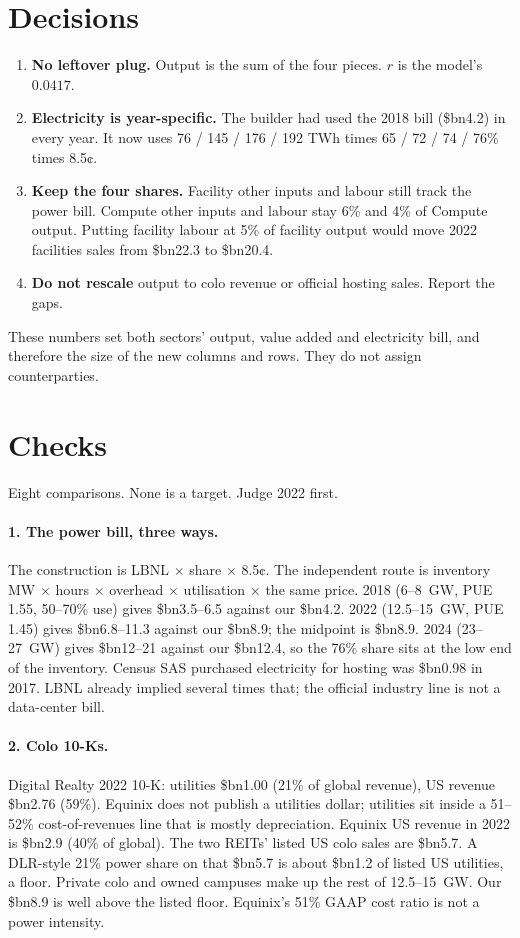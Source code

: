 \documentclass[11pt]{article}
\newcommand{\bn}{\$bn}
\begin{document}
\section{Decisions}

\begin{enumerate}
\item \textbf{No leftover plug.} Output is the sum of the four pieces. $r$ is the model's $0.0417$.
\item \textbf{Electricity is year-specific.} The builder had used the 2018 bill (\bn4.2) in every year. It now uses 76 / 145 / 176 / 192 TWh times 65 / 72 / 74 / 76\% times 8.5¢.
\item \textbf{Keep the four shares.} Facility other inputs and labour still track the power bill. Compute other inputs and labour stay 6\% and 4\% of Compute output. Putting facility labour at 5\% of facility output would move 2022 facilities sales from \bn22.3 to \bn20.4.
\item \textbf{Do not rescale} output to colo revenue or official hosting sales. Report the gaps.
\end{enumerate}

These numbers set both sectors' output, value added and electricity bill, and therefore the size of the new columns and rows. They do not assign counterparties.

\section{Checks}
\label{sec:checks}

Eight comparisons. None is a target. Judge 2022 first.

\paragraph{1. The power bill, three ways.}
The construction is LBNL $\times$ share $\times$ 8.5¢. The independent route is inventory MW $\times$ hours $\times$ overhead $\times$ utilisation $\times$ the same price. 2018 (6--8~GW, PUE 1.55, 50--70\% use) gives \bn3.5--6.5 against our \bn4.2. 2022 (12.5--15~GW, PUE 1.45) gives \bn6.8--11.3 against our \bn8.9; the midpoint is \bn8.9. 2024 (23--27~GW) gives \bn12--21 against our \bn12.4, so the 76\% share sits at the low end of the inventory. Census SAS purchased electricity for hosting was \bn0.98 in 2017. LBNL already implied several times that; the official industry line is not a data-center bill.

\paragraph{2. Colo 10-Ks.}
Digital Realty 2022 10-K: utilities \bn1.00 (21\% of global revenue), US revenue \bn2.76 (59\%). Equinix does not publish a utilities dollar; utilities sit inside a 51--52\% cost-of-revenues line that is mostly depreciation. Equinix US revenue in 2022 is \bn2.9 (40\% of global). The two REITs' listed US colo sales are \bn5.7. A DLR-style 21\% power share on that \bn5.7 is about \bn1.2 of listed US utilities, a floor. Private colo and owned campuses make up the rest of 12.5--15~GW. Our \bn8.9 is well above the listed floor. Equinix's 51\% GAAP cost ratio is not a power intensity.
\end{document}
